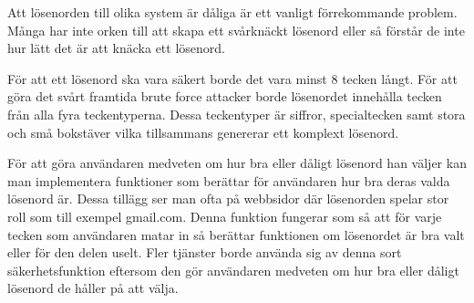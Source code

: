 Att lösenorden till olika system är dåliga är ett vanligt förrekommande problem. Många har inte orken till att skapa ett svårknäckt lösenord eller så förstår de inte hur lätt det är att knäcka ett lösenord. 

För att ett lösenord ska vara säkert borde det vara minst 8 tecken långt. För att göra det svårt framtida brute force attacker borde lösenordet innehålla tecken från alla fyra teckentyperna. Dessa teckentyper är siffror, specialtecken samt stora och små bokstäver vilka tillsammans genererar ett komplext lösenord. 

För att göra användaren medveten om hur bra eller dåligt lösenord han väljer kan man implementera funktioner som berättar för användaren hur bra deras valda lösenord är. Dessa tillägg ser man ofta på webbsidor där lösenorden spelar stor roll som till exempel gmail.com. Denna funktion fungerar som så att för varje tecken som användaren matar in så berättar funktionen om lösenordet är bra valt eller för den delen uselt. Fler tjänster borde använda sig av denna sort säkerhetsfunktion eftersom den gör användaren medveten om hur bra eller dåligt lösenord de håller på att välja.